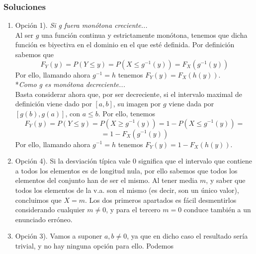\documentclass[fleqn]{article}
\begin{document}
\begin{enumerate}
                
                \newpage

                \subsubsection{Soluciones}
                        
                        \begin{enumerate}
                                \item Opción 1). \textit{Si g fuera monótona creciente...}\\
                                        Al ser $g$ una función continua y estrictamente monótona, tenemos que dicha función es biyectiva en el dominio
                                        en el que esté definida. Por definición sabemos que 
                                        $$F_Y(y) = P(Y \leq y) = P(X\leq g^{-1}(y)) = F_X (g^{-1}(y))$$
                                        Por ello, llamando ahora $g^{-1}=h$ tenemos $F_Y(y) = F_X (h(y))$.\\ 
                                        *\textit{Como g es monótona decreciente...}\\
                                        Basta considerar ahora que, por ser decreciente, si el intervalo maximal de definición viene dado por $[a, b]$, su imagen 
                                        por $g$ viene dada por $[g(b), g(a)]$, con $a\leq b$. Por ello, tenemos
                                        $$F_Y(y) = P(Y \leq y) = P(X\geq g^{-1}(y)) = 1 - P(X\leq g^{-1}(y)) =$$
                                        $$= 1 - F_X (g^{-1}(y))$$
                                        Por ello, llamando ahora $g^{-1}=h$ tenemos $F_Y(y) = 1 - F_X (h(y))$.\\
                                \item Opción 4). Si la desviación típica vale 0 significa que el intervalo que contiene a todos los elementos es de longitud nula, 
                                        por ello sabemos que todos los elementos del conjunto han de ser el mismo. Al tener media $m$, y saber que todos
                                        los elementos de la v.a. son el mismo (es decir, son un único valor), concluimos que $X=m$. Los dos primeros 
                                        apartados es fácil desmentirlos considerando cualquier $m \neq 0$, y para el tercero $m=0$ conduce también a
                                        un enunciado erróneo. \\
                                \item Opción 3). Vamos a suponer $a,b \neq 0$, ya que en dicho caso el resultado sería trivial, y no hay ninguna opción para ello. Podemos

\end{enumerate}
\end{enumerate}
\end{document}

